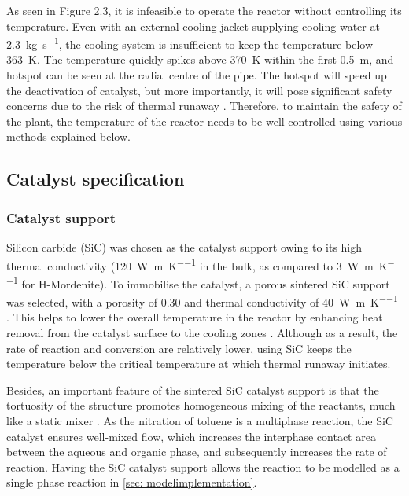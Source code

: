 As seen in Figure 2.3, it is infeasible to operate the reactor without controlling its temperature. Even with an external cooling jacket supplying cooling water at \SI{2.3}{\kilogram \per \second}, the cooling system is insufficient to keep the temperature below \SI{363}{\K}. The temperature quickly spikes above \SI{370}{\K} within the first \SI{0.5}{\m}, and hotspot can be seen at the radial centre of the pipe. The hotspot will speed up the deactivation of catalyst, but more importantly, it will pose significant safety concerns due to the risk of thermal runaway \cite{nguyen_flow_1994}. Therefore, to maintain the safety of the plant, the temperature of the reactor needs to be well-controlled using various methods explained below.

\subsection{Catalyst specification}
\subsubsection{Catalyst support}
\label{sec:catalyst support}
Silicon carbide (SiC) was chosen as the catalyst support owing to its high thermal conductivity (\SI{120}{\W\per\m\per\K} in the bulk, as compared to \SI{3}{\W\per\m\per\K} for H-Mordenite). To immobilise the catalyst, a porous sintered SiC support was selected, with a porosity of 0.30 and thermal conductivity of \SI{40}{\W\per\m\per\K} \cite{jang_thermophysical_2007}. This helps to lower the overall temperature in the reactor by enhancing heat removal from the catalyst surface to the cooling zones \cite{ledoux_silicon_2001}. Although as a result, the rate of reaction and conversion are relatively lower, using SiC keeps the temperature below the critical temperature at which thermal runaway initiates.

Besides, an important feature of the sintered SiC catalyst support is that the tortuosity of the structure promotes homogeneous mixing of the reactants, much like a static mixer \cite{duong-viet_silicon_2016}. As the nitration of toluene is a multiphase reaction, the SiC catalyst ensures well-mixed flow, which increases the interphase contact area between the aqueous and organic phase, and subsequently increases the rate of reaction. Having the SiC catalyst support allows the reaction to be modelled as a single phase reaction in \cref{sec: modelimplementation}.

